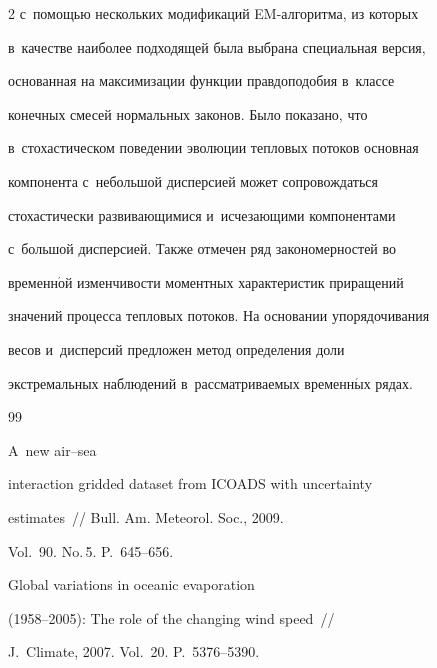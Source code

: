\begin{multicols}{2}
с~по\-мощью нескольких модификаций EM-алгоритма, из которых 


в~качестве наиболее подходящей была выбрана специальная версия,


основанная на максимизации функции правдоподобия в~классе


конечных смесей нормальных законов. Было показано, что 


в~стохастическом поведении эволюции тепловых потоков основная


компонента с~небольшой дисперсией может сопровождаться


стохастически развивающимися и~исчезающими компонентами 


с~большой дисперсией. Также отмечен ряд закономерностей во


временн$\acute{\mbox{о}}$й изменчивости моментных характеристик приращений


значений процесса теп\-ло\-вых потоков. На основании упорядочивания


весов и~дисперсий предложен метод определения доли


экстремальных наблюдений в~рас\-смат\-ри\-ва\-емых временн$\acute{\mbox{ы}}$х рядах.





{\small\frenchspacing


 {%




 \begin{thebibliography}{99}




 A~new air--sea


interaction gridded dataset from ICOADS with uncertainty


estimates~// Bull. Am. Meteorol. Soc., 2009.


Vol.~90. No.\,5. P.~645--656.







 Global variations in oceanic evaporation


(1958--2005): The role of the changing wind speed~// 


J.~Climate, 2007. Vol.~20. P.~5376--5390.








\end{thebibliography}}}
\end{multicols}
